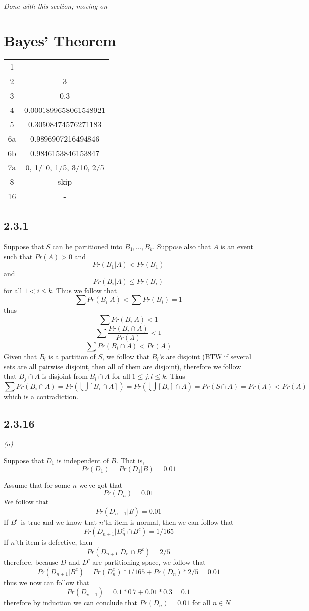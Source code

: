 \documentclass[11pt,oneside,titlepage]{book}
\begin{document}
\textit{Done with this section; moving on}

\section{Bayes' Theorem}

\begin{tabular}[center]{||c | c|| }
  \hline
  1 & - \\
  2 & 3 \\
  3 & 0.3 \\
  4 & 0.0001899658061548921 \\
  5 & 0.30508474576271183 \\
  6a & 0.9896907216494846 \\
  6b & 0.9846153846153847 \\
  7a & 0, 1/10, 1/5, 3/10, 2/5 \\
  8 & skip \\
  16 & - \\
  \hline 
\end{tabular}

\subsection*{2.3.1}

Suppose that $S$ can be partitioned into $B_1, ..., B_k$. Suppose also  that $A$
is an event such that $Pr(A) > 0$ and 
$$Pr(B_1|A) < Pr(B_1)$$
and
$$Pr(B_i|A) \leq Pr(B_i)$$
for all $1 < i \leq k$.
Thus we follow that
$$\sum{Pr(B_i|A)} < \sum{Pr(B_i)} = 1$$
thus
$$\sum{Pr(B_i|A)} <  1$$
$$\sum{\frac{Pr(B_i \cap A)}{Pr(A)}} <  1$$
$$\sum{Pr(B_i \cap A)} <  Pr(A)$$
Given that $B_i$ is a partition of $S$, we follow that $B_i$'s are disjoint (BTW if several sets
are all pairwise disjoint, then all of them are disjoint), therefore we follow that
$B_j \cap A$ is disjoint from $B_l \cap A$ for all $1 \leq j, l \leq k$. Thus
$$\sum{Pr(B_i \cap A)} = Pr(\bigcup{[B_i \cap A]}) = Pr(\bigcup{[B_i]} \cap A) = Pr(S \cap A)
= Pr(A) <  Pr(A)$$
which is a contradiction.

\subsection*{2.3.16}

\textit{(a)}

Suppose that $D_1$ is independent of $B$. That is,
$$Pr(D_1) = Pr(D_1 | B) = 0.01$$

Assume that for some $n$ we've got that
$$Pr(D_n) = 0.01$$
We follow that
$$Pr(D_{n + 1}|B) = 0.01$$ 
If $B^c$ is true and we know that $n$'th item is normal, then we can follow that 
$$Pr(D_{n + 1}| D_n^c \cap B^c ) = 1/165$$
If $n$'th item is defective, then
$$Pr(D_{n + 1}| D_n \cap B^c ) = 2/5$$
therefore, because $D$ and $D^c$ are partitioning space, we follow that
$$Pr(D_{n + 1}|B^c) = Pr(D_n^c) * 1/165 + Pr(D_n) * 2/5 = 0.01$$
thus we now can follow that
$$Pr(D_{n + 1}) = 0.1 * 0.7 + 0.01 * 0.3 = 0.1$$
therefore by induction we can conclude that $Pr(D_n) = 0.01$ for all $n \in N$
\end{document}

